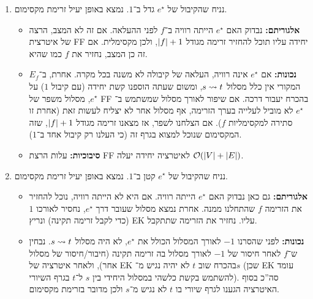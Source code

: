 \documentclass[]{article}
\newcommand\str {^{\star}}
\begin{document}
\begin{enumerate}
\begin{proof}
			נפנה להוכיח את נכונות האלגוריתם. ברור שאם מצאנו מסלול הוא חיובי (שכן הוא ב־$\tl G$) ואז סיימנו. אך כאורה לא מובטח לנו ש־DFS יוכל להמשיך לנצח עד הגעה ל־$t$ או $s$, או עד למציאת מעגל: אך בהנחה ש־DFS עבר בדיוק על $(w_1, w_2)$ כלשהי, בהכרח $f(w_1, w_2) > 0$ ולכן מאילוץ הקיבול סכום הזרימות היוצאות $\sum_{\tl v \in V} f(w_1, \tl v) > 0$ דהיינו יש קשת חיובית כלשהי שיוצאת מ־$(w_1, w_2)$ וה־DFS יוכל להמשיך להתקדם (אלא אם זו קשת שהוא כבר גילה, ואז סגרנו מעגל). באופן זהה בעבור הגרף המשוחלף (רק הפוך, הסכום $\sum_{\tl v \in V} f(\tl v, w_1)$ יהיה חיובי). משום שה־DFS תמיד יוכל להתקדם, האלגוריתם שתיארנו אכן יסתיים במציאת מעגל או במסלול $s \squig t$ דרך $e \str = (v, u)$ בהכרח. 
		\end{proof}
		\textit{הערה: }הסיבוכיות של הרצת שני DFS־ים ובניית גרף משוחלף היא $\oc(\sof + \sof E)$. 
		\item נניח שהקיבול של $e\str$ גדל ב־$1$. נמצא באופן יעיל זרימת מקסימום. 
		\begin{itemize}
			\item \textbf{אלגוריתם: }נבדוק האם $e\str$ הייתה רוויה ב־$f$ לפני ההעלאה. אם זה לא המצב, הרצה של איטרצית FF יחידה עליו תוכל להחזיר זרימה מגודל $\left \lvert f \right \rvert + 1$, ולכן מקסימלית. אם זה כן המצב, נחזיר את $f$ כמו שהיא. 
			\item \textbf{נכונות: }אם $e\str$ אינה רוויה, העלאה של קיבולה לא משנה בכל מקרה. אחרת, ב־$E_f$ המקורי אין כלל מסלול $s \squig t$, ומשום שעתה הוספנו קשת יחידה (עם קיבול $1$) על $e\str$, מסלול משפר של FF בהכרח יעבור דרכה. אם שיפור לאורך מסלול שמשתמש ב־$e\str$ לא מוביל לעלייה בערך הזרימה, אף מסלול אחר לא יצליח לעשות זאת (אחרת זו סתירה למקסימליות $f$). אם הצלחנו לשפר, אז מצאנו זרימה מגודל $\left \lvert f \right \rvert + 1$, שזה המקסימום שנוכל למצוא בגרף זה (כי העלנו רק קיבול אחד ב־$1$). 
			\item \textbf{סיבוכיות: }עלות הרצת FF לאיטרציה יחידה יעלה $\mathcal{O}(\left \lvert V \right \rvert + \left \lvert E \right \rvert)$. 
		\end{itemize}
		\item נניח שהקיבול של $e\str$ קטן ב־$1$. נמצא באופן יעיל זרימת מקסימום. 
		\begin{itemize}
			\item \textbf{אלגוריתם: }גם כאן נבדוק האם $e\str$ הייתה רוויה. אם היא לא הייתה רוויה, נוכל להחזיר את הזרימה $f$ שהתחלנו ממנה. אחרת נמצא מסלול שעובר דרך $e\str$, נחסיר לאורכו $1$ (כדי לקבל זרימה תקינה) ונריץ EK עליו. נחזיר את הזרימה שתתקבל. 
			\item \textbf{נכונות: }לפני שהסרנו $-1$ לאורך המסלול הכולל את $e\str$, לא היה מסלול $s \squig t$. נבחין ש־$f$ לאחר חיסור של $-1$ לאורך מסלול בה זרימה תקינה (חיבור/חיסור של מסלול אחר), ולאחר איטרציה של EK בהכרח שוב $t$ לא יהיה נגיש מ־$s$ (שכן EK עומד להשתמש בקשת כלשהי במסלול היחידי בין $s$ ל־$t$ בגרף השיורי). סה''כ בסוף האיטרציה הגענו לגרף שיורי בו $t$ לא נגיש מ־$s$ ולכן מדובר בזרימת מקסימום. 
			

\end{itemize}
\end{enumerate}
\end{document}
